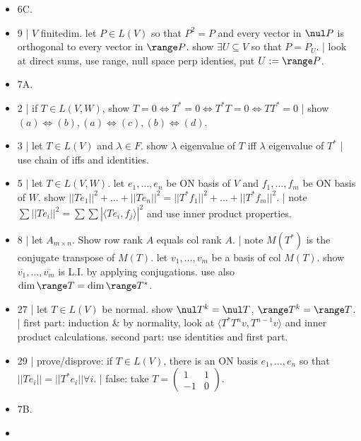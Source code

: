 \begin{itemize}
	\item 6C. 
	\item 9 | $V$ finitedim. let $P \in L(V)$ so that $P^2=P$ and every vector in $\nul P$ is orthogonal to every vector in $\range P$. show $\exists U \subseteq V$ so that $P=P_U$. | look at direct sums, use range, null space perp identies, put $U:= \range P$. 
	\item 7A. 
	\item 2 | if $T \in L(V,W)$, show $T=0 \iff T^*=0 \iff T^*T=0 \iff TT^*=0$ | show $(a) \iff (b), (a) \iff (c), (b) \iff (d)$. 
	\item 3 | let $T \in L(V)$ and $\lambda \in F$. show $\lambda$ eigenvalue of $T$ iff $\lambda$ eigenvalue of $T^*$ | use chain of iffs and identities. 
	\item 5 | let $T \in L(V,W)$. let $e_1,\dots,e_n$ be ON basis of $V$ and $f_1,\dots,f_m$ be ON basis of $W$. show $||Te_1||^2 + \dots + ||Te_n||^2 = ||T^*f_1||^2 + \dots + ||T^*f_m||^2$. | note $\sum ||Te_i||^2 = \sum \sum |\langle Te_i,f_j \rangle|^2$ and use inner product properties. 
	\item 8 | let $A_{m \times n}$. Show row rank $A$ equals col rank $A$. | note $M(T^*)$ is the conjugate transpose of $M(T)$. let $v_1,\dots,v_m$ be a basis of col $M(T)$. show $\overline{v_1},\dots,\overline{v_m}$ is L.I. by applying conjugations. use also $\dim\range T = \dim\range T^*$. 
	\item 27 | let $T \in L(V)$ be normal. show $\nul T^k = \nul T$, $\range T^k = \range T$. | first part: induction \& by normality, look at $\langle T^*T^n v, T^{n-1}v \rangle$ and inner product calculations. second part: use identities and first part. 
	\item 29 | prove/disprove: if $T \in L(V)$, there is an ON basis $e_1,\dots,e_n$ so that $||Te_i|| = ||T^*e_i|| \forall i$. | false: take $T = \begin{pmatrix} 1 & 1 \\ -1 & 0 \end{pmatrix}$. 
	\item 7B. 
	\item 
\end{itemize}



